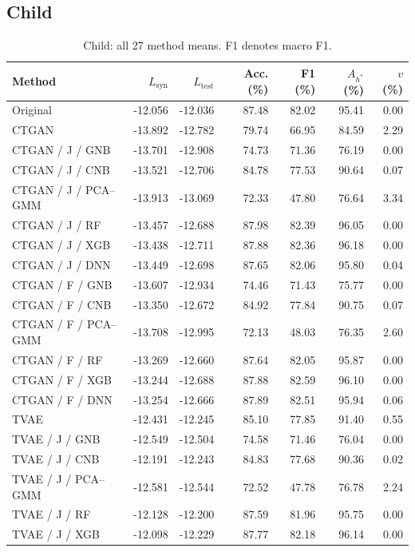 \documentclass[11pt,letterpaper]{article}
\newcommand{\Lsyn}{L_{\mathrm{syn}}}
\newcommand{\Ltest}{L_{\mathrm{test}}}
\begin{document}
\subsection{Child}
\begin{table}[H]\centering
\caption{Child: all 27 method means. F1 denotes macro F1.}\label{tab:all-child}
\small
\begin{tabular}{lrrrrrr}\toprule
Method & $\Lsyn$ & $\Ltest$ & Acc. (\%) & F1 (\%) & $A_{h^*}$ (\%) & $v$ (\%)\\\midrule
Original & -12.056 & -12.036 & 87.48 & 82.02 & 95.41 & 0.00\\
CTGAN & -13.892 & -12.782 & 79.74 & 66.95 & 84.59 & 2.29\\
CTGAN / J / GNB & -13.701 & -12.908 & 74.73 & 71.36 & 76.19 & 0.00\\
CTGAN / J / CNB & -13.521 & -12.706 & 84.78 & 77.53 & 90.64 & 0.07\\
CTGAN / J / PCA--GMM & -13.913 & -13.069 & 72.33 & 47.80 & 76.64 & 3.34\\
CTGAN / J / RF & -13.457 & -12.688 & 87.98 & 82.39 & 96.05 & 0.00\\
CTGAN / J / XGB & -13.438 & -12.711 & 87.88 & 82.36 & 96.18 & 0.00\\
CTGAN / J / DNN & -13.449 & -12.698 & 87.65 & 82.06 & 95.80 & 0.04\\
CTGAN / F / GNB & -13.607 & -12.934 & 74.46 & 71.43 & 75.77 & 0.00\\
CTGAN / F / CNB & -13.350 & -12.672 & 84.92 & 77.84 & 90.75 & 0.07\\
CTGAN / F / PCA--GMM & -13.708 & -12.995 & 72.13 & 48.03 & 76.35 & 2.60\\
CTGAN / F / RF & -13.269 & -12.660 & 87.64 & 82.05 & 95.87 & 0.00\\
CTGAN / F / XGB & -13.244 & -12.688 & 87.88 & 82.59 & 96.10 & 0.00\\
CTGAN / F / DNN & -13.254 & -12.666 & 87.89 & 82.51 & 95.94 & 0.06\\
TVAE & -12.431 & -12.245 & 85.10 & 77.85 & 91.40 & 0.55\\
TVAE / J / GNB & -12.549 & -12.504 & 74.58 & 71.46 & 76.04 & 0.00\\
TVAE / J / CNB & -12.191 & -12.243 & 84.83 & 77.68 & 90.36 & 0.02\\
TVAE / J / PCA--GMM & -12.581 & -12.544 & 72.52 & 47.78 & 76.78 & 2.24\\
TVAE / J / RF & -12.128 & -12.200 & 87.59 & 81.96 & 95.75 & 0.00\\
TVAE / J / XGB & -12.098 & -12.229 & 87.77 & 82.18 & 96.14 & 0.00\\

\end{tabular}
\end{table}
\end{document}
